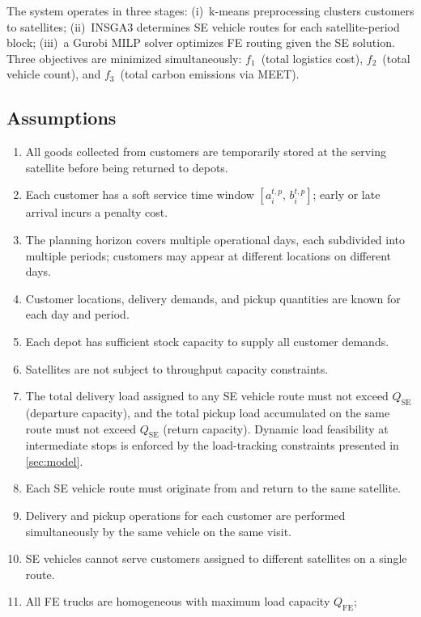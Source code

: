 \documentclass[11pt, a4paper]{article}
\newcommand{\QFE}{Q_{\mathrm{FE}}}
\newcommand{\QSE}{Q_{\mathrm{SE}}}
\numberwithin{equation}{section}
\begin{document}
The system operates in three stages: (i)~k-means preprocessing clusters
customers to satellites; (ii)~INSGA3 determines SE vehicle routes for each
satellite-period block; (iii)~a Gurobi MILP solver optimizes FE routing given
the SE solution.  Three objectives are minimized simultaneously:
$f_1$~(total logistics cost), $f_2$~(total vehicle count), and
$f_3$~(total carbon emissions via MEET).

\subsection{Assumptions}

\begin{enumerate}
  \item All goods collected from customers are temporarily stored at the
        serving satellite before being returned to depots.
  \item Each customer has a soft service time window $[a_i^{t,p},\,b_i^{t,p}]$;
        early or late arrival incurs a penalty cost.
  \item The planning horizon covers multiple operational days, each subdivided
        into multiple periods; customers may appear at different locations on
        different days.
  \item Customer locations, delivery demands, and pickup quantities are known
        for each day and period.
  \item Each depot has sufficient stock capacity to supply all customer demands.
  \item Satellites are not subject to throughput capacity constraints.
  \item The total delivery load assigned to any SE vehicle route must not
        exceed $\QSE$ (departure capacity), and the total pickup load
        accumulated on the same route must not exceed $\QSE$ (return capacity).
        Dynamic load feasibility at intermediate stops is enforced by the
        load-tracking constraints presented in \cref{sec:model}.
  \item Each SE vehicle route must originate from and return to the same
        satellite.
  \item Delivery and pickup operations for each customer are performed
        simultaneously by the same vehicle on the same visit.
  \item SE vehicles cannot serve customers assigned to different satellites
        on a single route.
  \item All FE trucks are homogeneous with maximum load capacity $\QFE$;

\end{enumerate}
\end{document}
